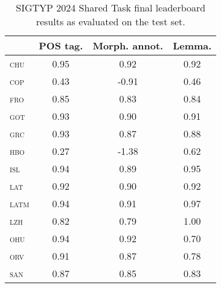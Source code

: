 \documentclass{../acl_latex.tex}
\begin{document}
\begin{table}[t]
\centering
\begin{tabular}{lccc}
\toprule
                 & POS tag. & Morph. annot. & Lemma. \\ \midrule
\textsc{chu}     & 0.95     & 0.92          & 0.92   \\ 
\textsc{cop}     & 0.43     & -0.91         & 0.46   \\ 
\textsc{fro}     & 0.85     & 0.83          & 0.84   \\
\textsc{got}     & 0.93     & 0.90          & 0.91   \\
\textsc{grc}     & 0.93     & 0.87          & 0.88   \\
\textsc{hbo}     & 0.27     & -1.38         & 0.62   \\
\textsc{isl}     & 0.94     & 0.89          & 0.95   \\
\textsc{lat}     & 0.92     & 0.90          & 0.92   \\
\textsc{latm}    & 0.94     & 0.91          & 0.97   \\
\textsc{lzh}     & 0.82     & 0.79          & 1.00   \\
\textsc{ohu}     & 0.94     & 0.92          & 0.70   \\
\textsc{orv}     & 0.91     & 0.87          & 0.78   \\
\textsc{san}     & 0.87     & 0.85          & 0.83   \\ \bottomrule 
\end{tabular}
\caption{
    SIGTYP 2024 Shared Task final leaderboard results as evaluated on the test set.
}
\label{table:main_results}
\end{table}
\end{document}
